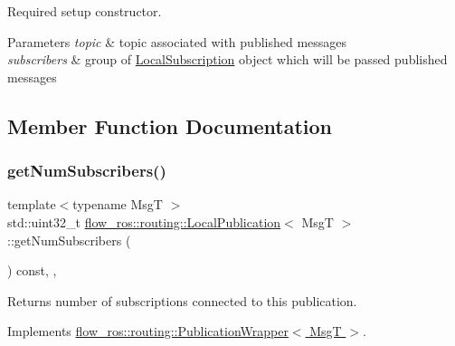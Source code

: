 Required setup constructor. 


\begin{DoxyParams}{Parameters}
{\em topic} & topic associated with published messages \\
\hline
{\em subscribers} & group of \hyperlink{classflow__ros_1_1routing_1_1_local_subscription}{Local\+Subscription} object which will be passed published messages \\
\hline
\end{DoxyParams}


\subsection{Member Function Documentation}
\mbox{\label{classflow__ros_1_1routing_1_1_local_publication_a3c79d6a426202a0ba0fad4f3de9e07b4}} 
\subsubsection{\texorpdfstring{get\+Num\+Subscribers()}{getNumSubscribers()}}
{\footnotesize\ttfamily template$<$typename MsgT $>$ \\
std\+::uint32\+\_\+t \hyperlink{classflow__ros_1_1routing_1_1_local_publication}{flow\+\_\+ros\+::routing\+::\+Local\+Publication}$<$ MsgT $>$\+::get\+Num\+Subscribers (\begin{DoxyParamCaption}{ }\end{DoxyParamCaption}) const\hspace{0.3cm}{\ttfamily [inline]}, {\ttfamily [override]}, {\ttfamily [virtual]}}



Returns number of subscriptions connected to this publication. 



Implements \hyperlink{classflow__ros_1_1routing_1_1_publication_wrapper_a3e2fb2a4cafe729a643af5ed5033dc50}{flow\+\_\+ros\+::routing\+::\+Publication\+Wrapper$<$ Msg\+T $>$}.

\mbox{\label{classflow__ros_1_1routing_1_1_local_publication_ab4d9ccc2b388dfe3db3ca1f4c1b0651d}} 
